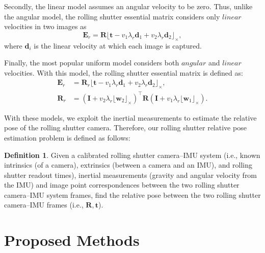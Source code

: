 \documentclass[10pt,twocolumn,letterpaper]{article}
\theoremstyle{definition}
\newtheorem{definition}{Definition}
\begin{document}
	
	Secondly, the linear model assumes an angular velocity to be zero.
	Thus, unlike the angular model, the rolling shutter essential matrix considers only $\textit{linear}$ velocities in two images as 
	\begin{equation}
	\mathbf{E}_{r} = \mathbf{R} \lfloor \mathbf{t} - v_1 \lambda_{r} \mathbf{d}_{1}  + v_2 \lambda_{r} \mathbf{d}_{2}  \rfloor_{\times}  ,
	\label{eq:rolling_shutter_essential_matrix}
	\end{equation}
	where $\mathbf{d}_i$ is the linear velocity at which each image is captured.
	
	
	Finally, the most popular uniform model considers both $\textit{angular}$ and $\textit{linear}$ velocities.
	With this model, the rolling shutter essential matrix is defined as:
	\begin{equation}
	\begin{split}
	\mathbf{E}_{r} & = \mathbf{R}_{r} \lfloor \mathbf{t} - v_1 \lambda_{r} \mathbf{d}_{1}  + v_2 \lambda_{r} \mathbf{d}_{2}  \rfloor_{\times} ,  \\
	\mathbf{R}_{r} & = \left(\mathbf{I} + v_2 \lambda_{r} \lfloor \mathbf{w}_2 \rfloor_{\times} \right)^{\top}  \mathbf{R} \left(\mathbf{I} + v_1 \lambda_{r} \lfloor \mathbf{w}_1 \rfloor_{\times} \right) .
	\end{split}
	\label{eq:rolling_shutter_essential_matrix}
	\end{equation}
	
	With these models, we exploit the inertial measurements to estimate the relative pose of the rolling shutter camera.
	Therefore, our rolling shutter relative pose estimation problem is defined as follows:
	\begin{definition}{}
		Given a calibrated rolling shutter camera--IMU system (i.e., known intrinsics (of a camera), extrinsics (between a camera and an IMU), and rolling shutter readout times), inertial measurements (gravity and angular velocity from the IMU) and image point correspondences between the two rolling shutter camera--IMU system frames, find the relative pose between the two rolling shutter camera--IMU frames (i.e., $\mathbf{R}, \mathbf{t}$).
	\end{definition}
	
	
	\section{Proposed Methods}
	
\end{document}
